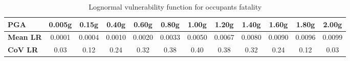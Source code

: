 \begin{table}[htbp]

\centering
\begin{tabular}{ l c c c c c c c c c c c}

\hline
\rowcolor{anti-flashwhite}
\bf{PGA} & \bf{0.005g} & \bf{0.15g} & \bf{0.40g} & \bf{0.60g} & \bf{0.80g} & \bf{1.00g} & \bf{1.20g} & \bf{1.40g} & \bf{1.60g} & \bf{1.80g} & \bf{2.00g} \\
\hline
\bf{Mean LR} & 0.0001 & 0.0004 & 0.0010 & 0.0020 & 0.0033 & 0.0050 & 0.0067 & 0.0080 & 0.0090 & 0.0096 & 0.0099 \\
\bf{CoV LR} & 0.03 & 0.12 & 0.24 & 0.32 & 0.38 & 0.40 & 0.38 & 0.32 & 0.24 & 0.12 & 0.03 \\
\hline
\end{tabular}

\caption{Lognormal vulnerability function for occupants fatality}
\label{tab:vf-ln-tax1-occ}
\end{table}